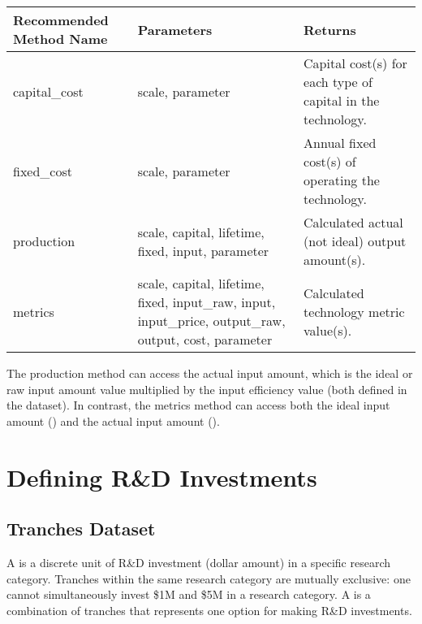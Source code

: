 \documentclass[letterpaper,10pt,english]{sphinxmanual}
\begin{document}
\begin{savenotes}\sphinxattablestart
\centering
{}
\sphinxthecaptionisattop
{}\label{\detokenize{cheat-sheet:table-4}}\label{\detokenize{cheat-sheet:tbl-techmethods}}
\sphinxaftertopcaption
\begin{tabulary}{\linewidth}[t]{|T|T|T|}
\hline
\sphinxstyletheadfamily 
Recommended Method Name
&\sphinxstyletheadfamily 
Parameters
&\sphinxstyletheadfamily 
Returns
\\
\hline
capital\_cost
&
scale, parameter
&
Capital cost(s) for each type of capital in the technology.
\\
\hline
fixed\_cost
&
scale, parameter
&
Annual fixed cost(s) of operating the technology.
\\
\hline
production
&
scale, capital, lifetime, fixed, input, parameter
&
Calculated actual (not ideal) output amount(s).
\\
\hline
metrics
&
scale, capital, lifetime, fixed, input\_raw, input, input\_price, output\_raw, output, cost, parameter
&
Calculated technology metric value(s).
\\
\hline
\end{tabulary}
\par
\sphinxattableend\end{savenotes}

The production method can access the actual input amount, which is the ideal or raw input amount value multiplied by the input efficiency value (both defined in the  dataset). In contrast, the metrics method can access both the ideal input amount () and the actual input amount ().


\section{Defining R\&D Investments}
\label{\detokenize{cheat-sheet:defining-r-d-investments}}

\subsection{Tranches Dataset}
\label{\detokenize{cheat-sheet:tranches-dataset}}
A  is a discrete unit of R\&D investment (dollar amount) in a specific research category. Tranches within the same research category are mutually exclusive: one cannot simultaneously invest \$1M and \$5M in a research category. A  is a combination of tranches that represents one option for making R\&D investments.
\end{document}
